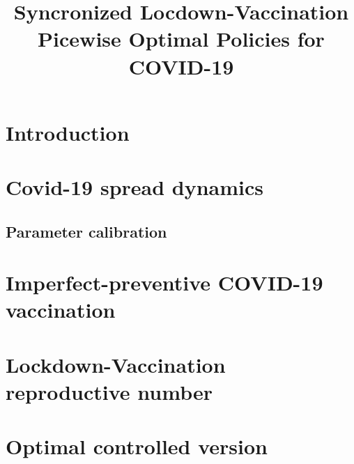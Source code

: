 \documentclass[a4paper,fleqn]{cas-sc}
\begin{document}
\let \WriteBookmarks \relax
\def \floatpagepagefraction{1}
\def \textpagefraction{.001}



\title [mode = title]{Syncronized Locdown-Vaccination
  Picewise Optimal Policies for COVID-19}



%
\maketitle
    \section{Introduction}
        
    \section{Covid-19 spread dynamics}
        \label{sec:Covid19_spread}
        
        \subsection{Parameter calibration}
          
    \section{Imperfect-preventive COVID-19 vaccination}
        \label{sec:vaccination_model}
        
    \section{Lockdown-Vaccination reproductive number}
         \label{sec:reproductive_number}
         
    \section{Optimal controlled version}
         \label{sec:optimal_controlled}
         
\end{document}
